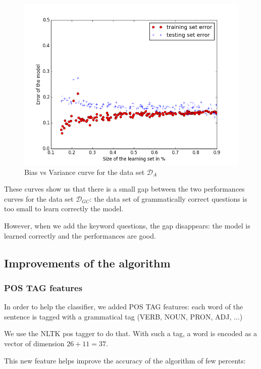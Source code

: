 \begin{figure}[!ht]
  \centering
  \caption{Bias vs Variance curve for the data set  $\mathcal{D}_{A}$ }
  \label{sandalone:bias_vs_variance_3}
    \includegraphics[scale=0.5]{../NLP-standalone-images/BiasVsVarianceD_A.png}
\end{figure}

These curves show us that there is a small gap between the two performances curves for the data set $\mathcal{D}_{GC}$: the data set of grammatically correct questions is too small to learn correctly the model.

However, when we add the keyword questions, the gap disappears: the model is learned correctly and the performances are good.

\subsection{Improvements of the algorithm}

\subsubsection{POS TAG features}

In order to help the classifier, we added POS TAG features: each word of the sentence is tagged with a grammatical tag (VERB, NOUN, PRON, ADJ, ...)

We use the NLTK pos tagger to do that. With such a tag, a word is encoded as a vector of dimension $26+11 = 37$.

This new feature helps improve the accuracy of the algorithm of few percents:

